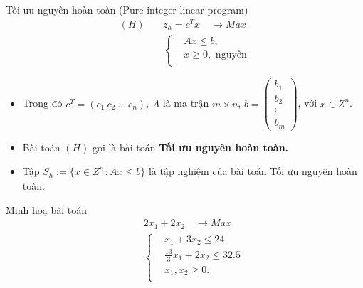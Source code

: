 \documentclass[12pt,a4paper]{report}
\begin{document}
{Tối ưu nguyên hoàn toàn (Pure integer linear program)}
    \begin{equation} \label{H}
        \begin{split}
        (H) \quad & z_h=c^Tx \quad \longrightarrow Max \\
                  & \left\{\begin{split}
                    &Ax \leq  b, \\
                    &x \geq 0, \text{ nguyên} \\
                    \end{split}\right.    
        \end{split}
        \end{equation}            
    \begin{itemize} 
    \item Trong đó $c^T=(c_1 \: c_2 \: \ldots \: c_n)$, $A$ là ma trận $m\times n$, $b=\begin{pmatrix}
        b_1 \\
        b_2 \\
        \vdots \\
        b_m
        \end{pmatrix}$, với $x\in Z^n$.
    \item Bài toán $(H)$ gọi là bài toán \textbf{Tối ưu nguyên hoàn toàn.}
    \item Tập $S_h:=\{x\in Z^n_+: Ax\leq b\}$ là tập nghiệm của bài toán Tối ưu nguyên hoàn toàn.
    \end{itemize}


 {Minh hoạ bài toán}
    \begin{equation}
        \begin{split}
        \quad & 2x_1 + 2x_2 \quad \longrightarrow Max \\
                    & \left\{\begin{split}
                    & x_1 + 3x_2 \leq 24 \\
                    & \frac{13}{3}x_1 + 2x_2 \leq 32.5 \\
                    &x_1, x_2 \geq 0. \\
                    \end{split}\right.    
        \end{split}
        \end{equation}            

\end{document}
